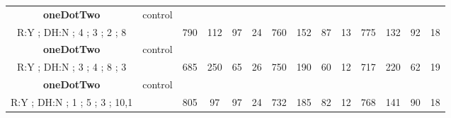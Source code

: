 \begin{table}[]
{\begin{tabular}{|c|c|c|c|c|c|c|c|c|c|c|c|c|c|}
\cellcolor{blue!15}\textbf{oneDotTwo} & control& {\color[HTML]{00009B} } & {\color[HTML]{9A0000} } & {\color[HTML]{009901} } &  & {\color[HTML]{00009B} } & {\color[HTML]{9A0000} } & {\color[HTML]{009901} } &  & {\color[HTML]{00009B} } & {\color[HTML]{9A0000} } & {\color[HTML]{009901} } &  \\ 
\cellcolor{ blue!15}R:Y ; DH:N ; 4 ; 3 ; 2 ; 8 &  & \multirow{-2}{*}{{\color[HTML]{00009B} 790}} & \multirow{-2}{*}{{\color[HTML]{9A0000} 112}} & \multirow{-2}{*}{{\color[HTML]{009901} 97}} & \multirow{-2}{*}{24} & \multirow{-2}{*}{{\color[HTML]{00009B} 760}} & \multirow{-2}{*}{{\color[HTML]{9A0000} 152}} & \multirow{-2}{*}{{\color[HTML]{009901} 87}} & \multirow{-2}{*}{13} & \multirow{-2}{*}{{\color[HTML]{00009B} 775}} & \multirow{-2}{*}{{\color[HTML]{9A0000} 132}} & \multirow{-2}{*}{{\color[HTML]{009901} 92}} & \multirow{-2}{*}{18} \\ \hline

\cellcolor{blue!15}\textbf{oneDotTwo} & control& {\color[HTML]{00009B} } & {\color[HTML]{9A0000} } & {\color[HTML]{009901} } &  & {\color[HTML]{00009B} } & {\color[HTML]{9A0000} } & {\color[HTML]{009901} } &  & {\color[HTML]{00009B} } & {\color[HTML]{9A0000} } & {\color[HTML]{009901} } &  \\ 
\cellcolor{ blue!15}R:Y ; DH:N ; 3 ; 4 ; 8 ; 3 &  & \multirow{-2}{*}{{\color[HTML]{00009B} 685}} & \multirow{-2}{*}{{\color[HTML]{9A0000} 250}} & \multirow{-2}{*}{{\color[HTML]{009901} 65}} & \multirow{-2}{*}{26} & \multirow{-2}{*}{{\color[HTML]{00009B} 750}} & \multirow{-2}{*}{{\color[HTML]{9A0000} 190}} & \multirow{-2}{*}{{\color[HTML]{009901} 60}} & \multirow{-2}{*}{12} & \multirow{-2}{*}{{\color[HTML]{00009B} 717}} & \multirow{-2}{*}{{\color[HTML]{9A0000} 220}} & \multirow{-2}{*}{{\color[HTML]{009901} 62}} & \multirow{-2}{*}{19} \\ \hline

\cellcolor{blue!15}\textbf{oneDotTwo} & control& {\color[HTML]{00009B} } & {\color[HTML]{9A0000} } & {\color[HTML]{009901} } &  & {\color[HTML]{00009B} } & {\color[HTML]{9A0000} } & {\color[HTML]{009901} } &  & {\color[HTML]{00009B} } & {\color[HTML]{9A0000} } & {\color[HTML]{009901} } &  \\ 
\cellcolor{ blue!15}R:Y ; DH:N ; 1 ; 5 ; 3 ; 10,1 &  & \multirow{-2}{*}{{\color[HTML]{00009B} 805}} & \multirow{-2}{*}{{\color[HTML]{9A0000} 97}} & \multirow{-2}{*}{{\color[HTML]{009901} 97}} & \multirow{-2}{*}{24} & \multirow{-2}{*}{{\color[HTML]{00009B} 732}} & \multirow{-2}{*}{{\color[HTML]{9A0000} 185}} & \multirow{-2}{*}{{\color[HTML]{009901} 82}} & \multirow{-2}{*}{12} & \multirow{-2}{*}{{\color[HTML]{00009B} 768}} & \multirow{-2}{*}{{\color[HTML]{9A0000} 141}} & \multirow{-2}{*}{{\color[HTML]{009901} 90}} & \multirow{-2}{*}{18} \\ \hline


\end{tabular}}
\end{table}
